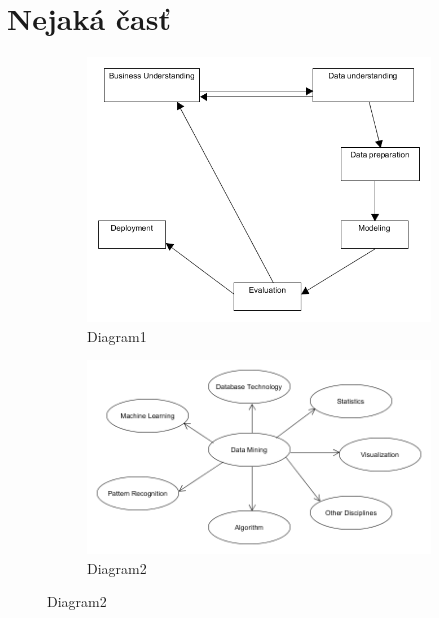 \documentclass[10pt,twocolumn,twoside,slovak,a4paper]{article}
\begin{document}
\section{Nejaká časť} \label{nejaka}
\begin{figure}[h!]
\centering
\begin{subfigure}[b]{0.4\linewidth}
  \includegraphics[width=\linewidth,angle=45]{diagram1.png}
  \caption{ Diagram1}
  \label{fig:Diagram1}
\end{subfigure}
\begin{subfigure}[b]{0.4\linewidth}
  \includegraphics[width=\linewidth]{diagram2.png}
  \caption{ Diagram2}
  \label{fig:Diagram2}
\end{subfigure}
\end{figure}
\end{document}
